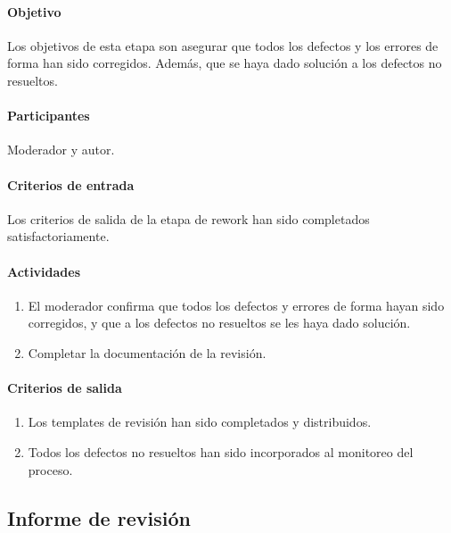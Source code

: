 \paragraph{Objetivo\\}

Los objetivos de esta etapa son asegurar que todos los defectos y los errores de forma han sido corregidos. Además, que se haya dado solución a los defectos no resueltos.

\paragraph{Participantes\\}

Moderador y autor.

\paragraph{Criterios de entrada\\}

Los criterios de salida de la etapa de rework han sido completados satisfactoriamente.

\paragraph{Actividades}

\begin{enumerate}
	\item
		El moderador confirma que todos los defectos y errores de forma hayan sido corregidos, y que a los defectos no resueltos se les haya dado solución.
	\item
		Completar la documentación de la revisión.
\end{enumerate}

\paragraph{Criterios de salida}

\begin{enumerate}
	\item
		Los templates de revisión han sido completados y distribuidos.
	\item
		Todos los defectos no resueltos han sido incorporados al monitoreo del proceso.
\end{enumerate}

\subsection{Informe de revisión}

